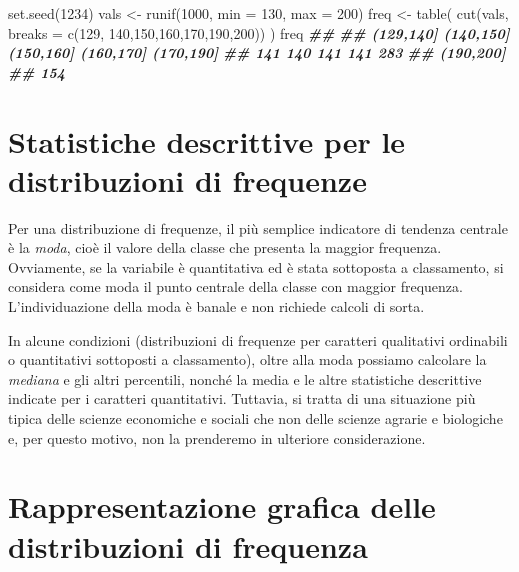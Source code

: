 \documentclass[
  12pt,
]{book}
\newenvironment{Shaded}{\begin{snugshade}}{\end{snugshade}}
\newcommand{\AttributeTok}[1]{\textcolor[rgb]{0.77,0.63,0.00}{#1}}
\newcommand{\DecValTok}[1]{\textcolor[rgb]{0.00,0.00,0.81}{#1}}
\newcommand{\DocumentationTok}[1]{\textcolor[rgb]{0.56,0.35,0.01}{\textbf{\textit{#1}}}}
\newcommand{\FunctionTok}[1]{\textcolor[rgb]{0.00,0.00,0.00}{#1}}
\newcommand{\NormalTok}[1]{#1}
\newcommand{\OtherTok}[1]{\textcolor[rgb]{0.56,0.35,0.01}{#1}}
\begin{document}
\begin{Shaded}
\begin{Highlighting}[]
\FunctionTok{set.seed}\NormalTok{(}\DecValTok{1234}\NormalTok{)}
\NormalTok{vals }\OtherTok{\textless{}{-}} \FunctionTok{runif}\NormalTok{(}\DecValTok{1000}\NormalTok{, }\AttributeTok{min =} \DecValTok{130}\NormalTok{, }\AttributeTok{max =} \DecValTok{200}\NormalTok{)}
\NormalTok{freq }\OtherTok{\textless{}{-}} \FunctionTok{table}\NormalTok{( }\FunctionTok{cut}\NormalTok{(vals, }\AttributeTok{breaks =} \FunctionTok{c}\NormalTok{(}\DecValTok{129}\NormalTok{, }\DecValTok{140}\NormalTok{,}\DecValTok{150}\NormalTok{,}\DecValTok{160}\NormalTok{,}\DecValTok{170}\NormalTok{,}\DecValTok{190}\NormalTok{,}\DecValTok{200}\NormalTok{)) )}
\NormalTok{freq}
\DocumentationTok{\#\# }
\DocumentationTok{\#\# (129,140] (140,150] (150,160] (160,170] (170,190] }
\DocumentationTok{\#\#       141       140       141       141       283 }
\DocumentationTok{\#\# (190,200] }
\DocumentationTok{\#\#       154}
\end{Highlighting}
\end{Shaded}

\hypertarget{statistiche-descrittive-per-le-distribuzioni-di-frequenze}{%
\section{Statistiche descrittive per le distribuzioni di frequenze}\label{statistiche-descrittive-per-le-distribuzioni-di-frequenze}}

Per una distribuzione di frequenze, il più semplice indicatore di tendenza centrale è la \emph{moda}, cioè il valore della classe che presenta la maggior frequenza. Ovviamente, se la variabile è quantitativa ed è stata sottoposta a classamento, si considera come moda il punto centrale della classe con maggior frequenza. L'individuazione della moda è banale e non richiede calcoli di sorta.

In alcune condizioni (distribuzioni di frequenze per caratteri qualitativi ordinabili o quantitativi sottoposti a classamento), oltre alla moda possiamo calcolare la \emph{mediana} e gli altri percentili, nonché la media e le altre statistiche descrittive indicate per i caratteri quantitativi. Tuttavia, si tratta di una situazione più tipica delle scienze economiche e sociali che non delle scienze agrarie e biologiche e, per questo motivo, non la prenderemo in ulteriore considerazione.

\hypertarget{rappresentazione-grafica-delle-distribuzioni-di-frequenza}{%
\section{Rappresentazione grafica delle distribuzioni di frequenza}\label{rappresentazione-grafica-delle-distribuzioni-di-frequenza}}
\end{document}
